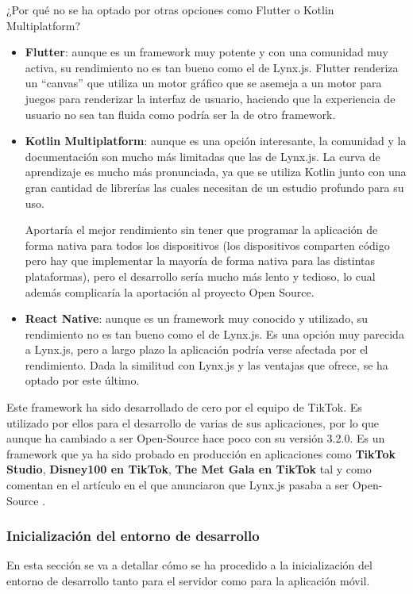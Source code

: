 ¿Por qué no se ha optado por otras opciones como Flutter o Kotlin Multiplatform?
\begin{itemize}
    \item \textbf{Flutter}: aunque es un framework muy potente y con una comunidad muy activa, su rendimiento no es tan bueno como el de Lynx.js.
        Flutter renderiza un ``canvas'' que utiliza un motor gráfico que se asemeja a un motor para juegos para renderizar la interfaz de usuario, haciendo que la experiencia de usuario no sea tan fluida como podría ser la de otro framework.
    \item \textbf{Kotlin Multiplatform}: aunque es una opción interesante, la comunidad y la documentación son mucho más limitadas que las de Lynx.js. La curva de aprendizaje es mucho más pronunciada, ya que se utiliza Kotlin junto con una gran cantidad de librerías las cuales necesitan de un estudio profundo para su uso.

        Aportaría el mejor rendimiento sin tener que programar la aplicación de forma nativa para todos los dispositivos (los dispositivos comparten código pero hay que implementar la mayoría de forma nativa para las distintas plataformas), pero el desarrollo sería mucho más lento y tedioso, lo cual además complicaría la aportación al proyecto Open Source.
    \item \textbf{React Native}: aunque es un framework muy conocido y utilizado, su rendimiento no es tan bueno como el de Lynx.js.
        Es una opción muy parecida a Lynx.js, pero a largo plazo la aplicación podría verse afectada por el rendimiento.
        Dada la similitud con Lynx.js y las ventajas que ofrece, se ha optado por este último.
\end{itemize}

Este framework ha sido desarrollado de cero por el equipo de TikTok. Es utilizado por ellos para el desarrollo de varias de sus aplicaciones, por lo que aunque ha cambiado a ser Open-Source hace poco con su versión 3.2.0. Es un framework que ya ha sido probado en producción en aplicaciones como \textbf{TikTok Studio}, \textbf{Disney100 en TikTok}, \textbf{The Met Gala en TikTok} tal y como comentan en el artículo en el que anunciaron que Lynx.js pasaba a ser Open-Source \parencite{lynx-article}.

\subsubsection{Inicialización del entorno de desarrollo}
En esta sección se va a detallar cómo se ha procedido a la inicialización del entorno de desarrollo tanto para el servidor como para la aplicación móvil.
